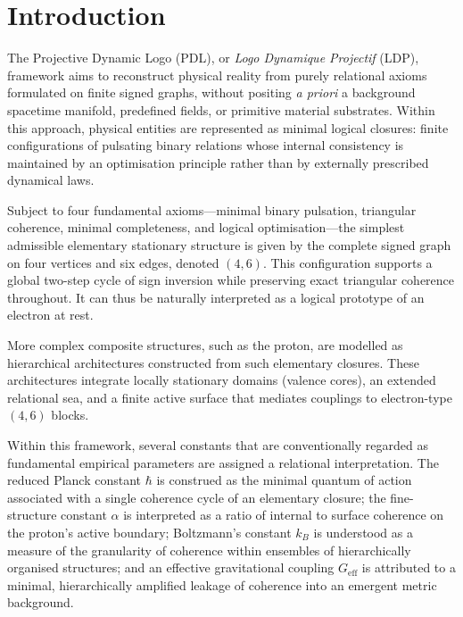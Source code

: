 \documentclass[11pt,a4paper]{article}
\theoremstyle{definition}
\begin{document}
\begin{abstract}
Finally, we outline how this probabilistic and topological reformulation interfaces with existing PDL/LDP reinterpretations of Born-type probabilities, gravitational coupling, and Boltzmann’s constant, thereby suggesting that quantum statistics, gravitation, and thermodynamic granularity may be construed as distinct macroscopic manifestations of a single, logically enforced imperfection of closure in a finite relational network.
\end{abstract}

\newpage

\section{Introduction}

The Projective Dynamic Logo (PDL), or \textit{Logo Dynamique Projectif} (LDP), framework aims to reconstruct physical reality from purely relational axioms formulated on finite signed graphs, without positing \textit{a priori} a background spacetime manifold, predefined fields, or primitive material substrates. Within this approach, physical entities are represented as minimal logical closures: finite configurations of pulsating binary relations whose internal consistency is maintained by an optimisation principle rather than by externally prescribed dynamical laws. 

Subject to four fundamental axioms—minimal binary pulsation, triangular coherence, minimal completeness, and logical optimisation—the simplest admissible elementary stationary structure is given by the complete signed graph on four vertices and six edges, denoted \((4,6)\). This configuration supports a global two-step cycle of sign inversion while preserving exact triangular coherence throughout. It can thus be naturally interpreted as a logical prototype of an electron at rest. 

More complex composite structures, such as the proton, are modelled as hierarchical architectures constructed from such elementary closures. These architectures integrate locally stationary domains (valence cores), an extended relational sea, and a finite active surface that mediates couplings to electron-type \((4,6)\) blocks.

Within this framework, several constants that are conventionally regarded as fundamental empirical parameters are assigned a relational interpretation. The reduced Planck constant \(\hbar\) is construed as the minimal quantum of action associated with a single coherence cycle of an elementary closure; the fine-structure constant \(\alpha\) is interpreted as a ratio of internal to surface coherence on the proton’s active boundary; Boltzmann’s constant \(k_B\) is understood as a measure of the granularity of coherence within ensembles of hierarchically organised structures; and an effective gravitational coupling \(G_{\mathrm{eff}}\) is attributed to a minimal, hierarchically amplified leakage of coherence into an emergent metric background. 
\end{document}
